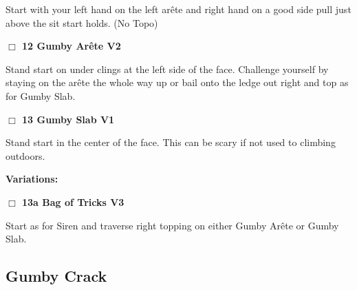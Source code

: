 \begin{multicols}{2}
\begin{adjustwidth}{0.5cm}{}
\begin{adjustwidth}{1.3em}{}
Start with your left hand on the left arête and right hand on a good side pull just above the sit start holds.
  (No Topo)
\end{adjustwidth}



\end{adjustwidth}


\needspace{2em}
\label{rt:Gumby Arête}
\colorbox{green!20}{
\parbox{0.95\linewidth}{
\hspace{-1ex}\textbf{$\Box$
12 Gumby Arête V2  
}}}
\begin{adjustwidth}{1.3em}{}			

Stand start on under clings at the left side of the face. Challenge yourself by staying on the arête the whole way up or bail onto the ledge out right and top as for Gumby Slab.
\end{adjustwidth}




\needspace{2em}
\label{rt:Gumby Slab}
\colorbox{green!20}{
\parbox{0.95\linewidth}{
\hspace{-1ex}\textbf{$\Box$
13 Gumby Slab V1  
}}}
\begin{adjustwidth}{1.3em}{}			

Stand start in the center of the face. This can be scary if not used to climbing outdoors.
\end{adjustwidth}


\begin{adjustwidth}{0.5cm}{}				
\needspace{4em}
\textbf{Variations:} \newline

\needspace{2em}
\label{vr:Bag of Tricks}
\colorbox{green!20}{
\parbox{0.95\linewidth}{
\hspace{-1ex}\textbf{$\Box$
13a Bag of Tricks V3  
}}}
\begin{adjustwidth}{1.3em}{}			

Start as for Siren and traverse right topping on either Gumby Arête or Gumby Slab.
\end{adjustwidth}



\end{adjustwidth}



\needspace{10em}
\subsection*{Gumby Crack}\label{bf:Gumby Crack}


\end{multicols}
